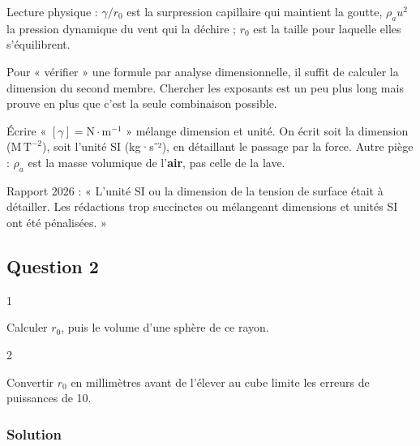 \documentclass[11pt,a4paper]{article}
\begin{document}
Lecture physique : \(\gamma/r_0\) est la surpression capillaire qui maintient la goutte, \(\rho_a u^2\) la pression dynamique du vent qui la déchire ; \(r_0\) est la taille pour laquelle elles s'équilibrent.

\begin{methode}

Pour « vérifier » une formule par analyse dimensionnelle, il suffit de calculer la dimension du second membre. Chercher les exposants est un peu plus long mais prouve en plus que c'est la seule combinaison possible.

\end{methode}

\begin{piege}

Écrire « \([\gamma] = \mathrm{N\cdot m^{-1}}\) » mélange dimension et unité. On écrit soit la dimension (\(\mathrm{M\,T^{-2}}\)), soit l'unité SI (kg·s⁻²), en détaillant le passage par la force. Autre piège : \(\rho_a\) est la masse volumique de l'\textbf{air}, pas celle de la lave.

\end{piege}

\begin{jury}

Rapport 2026 : « L'unité SI ou la dimension de la tension de surface était à détailler. Les rédactions trop succinctes ou mélangeant dimensions et unités SI ont été pénalisées. »

\end{jury}

\hypertarget{question-2}{%
\subsection{Question 2}\label{question-2}}

\begin{indication}{1}

Calculer \(r_0\), puis le volume d'une sphère de ce rayon.

\end{indication}

\begin{indication}{2}

Convertir \(r_0\) en millimètres avant de l'élever au cube limite les erreurs de puissances de 10.

\end{indication}

\hypertarget{solution-1}{%
\subsubsection{Solution}\label{solution-1}}
\end{document}
